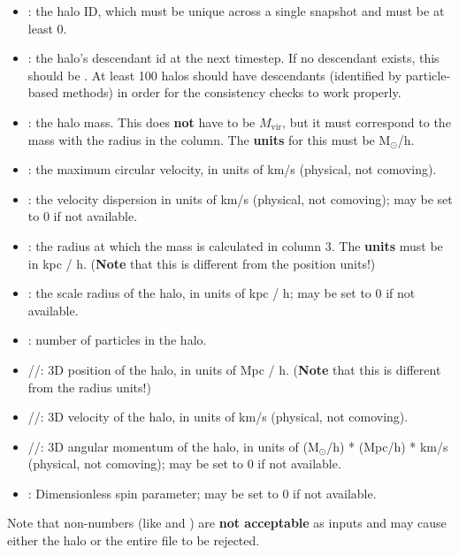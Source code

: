 \documentclass[12pt]{article}
\begin{document}
      \begin{itemize}
      \item {}: the halo ID, which must be unique across a single snapshot and must
         be at least 0.
      \item {}: the halo's descendant id at the next timestep.  If no
         descendant exists, this should be .  At least 100 halos should
         have descendants (identified by particle-based methods) in order for
         the consistency checks to work properly.
      \item {}: the halo mass.  This does \textbf{not} have to be $M_\mathrm{vir}$, but it must
         correspond to the mass with the radius in the  column.  The \textbf{units} for this must be
         M$_\odot$/h.
      \item {}: the maximum circular velocity, in units of km/s (physical, not comoving).
      \item {}: the velocity dispersion in units of
         km/s (physical, not comoving); may be set to 0 if not available.
      \item {}: the radius at which the mass is calculated in column 3.  The
         \textbf{units} must be in kpc / h.  (\textbf{Note} that this is different from the
         position units!)
      \item {}: the scale radius of the halo, in 
         units of kpc / h; may be set to 0 if not available.
	\item {}: number of particles in the halo.
      \item {}//: 3D position of the halo, in units of Mpc / h.  (\textbf{Note} that this
         is different from the radius units!)
      \item {}//: 3D velocity of the halo, in units of km/s (physical, not comoving).
      \item {}//: 3D angular momentum of the halo,
         in units of (M$_\odot$/h) * (Mpc/h) * km/s (physical, not comoving); may be set to 0 if not available.
      \item {}: Dimensionless spin parameter; may be set to 0 if not available.
      \end{itemize}
      
      Note that non-numbers (like  and ) are \textbf{not acceptable} as inputs
      and may cause either the halo or the entire file to be rejected. 
\end{document}
